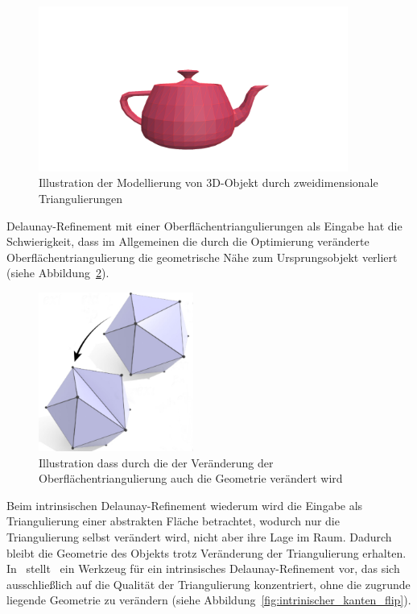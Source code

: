 \begin{figure}[H]%
    \centering
    \includegraphics[width=4in]{images/image7.png}
  \caption{Illustration  der Modellierung von 3D-Objekt durch zweidimensionale Triangulierungen }
  \label{fig:image7}
\end{figure}

Delaunay-Refinement  mit einer Oberflächentriangulierungen als Eingabe hat die Schwierigkeit, dass im Allgemeinen die durch die Optimierung veränderte  Oberflächentriangulierung die geometrische Nähe zum Ursprungsobjekt verliert (siehe Abbildung~\ref{fig:extrinsich_kanten_flip}).\\
\begin{figure}[H]%
    \centering
    \includegraphics[width=2in]{images/extrinsicher_kantenflip.jpg}
  \caption{Illustration  dass durch die der Veränderung der Oberflächentriangulierung auch die Geometrie verändert wird~\cite{Sharp:2019:NIT}}
  \label{fig:extrinsich_kanten_flip}
\end{figure}

Beim intrinsischen Delaunay-Refinement  wiederum wird die Eingabe als Triangulierung einer abstrakten Fläche betrachtet, wodurch nur die Triangulierung selbst verändert wird, nicht aber ihre Lage im Raum. Dadurch bleibt die Geometrie des Objekts trotz Veränderung der Triangulierung erhalten.
In~\cite{Sharp:2019:NIT} stellt~\citeauthor{Sharp:2019:NIT} ein Werkzeug für ein intrinsisches Delaunay-Refinement  vor, das sich ausschließlich auf die Qualität der Triangulierung konzentriert, ohne die zugrunde liegende Geometrie zu verändern (siehe Abbildung~\ref{fig:intrinischer_kanten_flip}).\\  


